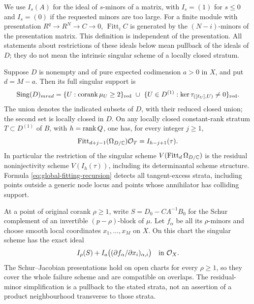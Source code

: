 We use $I_s(A)$ for the ideal of $s$-minors of a matrix, with
$I_s=(1)$ for $s\le0$ and $I_s=(0)$ if the requested minors are too
large. For a finite module with presentation $R^q\to R^N\to C\to0$,
$\operatorname{Fitt}_i C$ is generated by the $(N-i)$-minors of the
presentation matrix. This definition is independent of the presentation.
All statements about restrictions of these ideals below mean pullback
of the ideals of $D$; they do not mean the intrinsic singular scheme
of a locally closed stratum.

\begin{theorem}
\label{thm:global-polar-singularities}
Suppose $D$ is nonempty and of pure expected codimension $a>0$ in $X$,
and put $d=M-a$. Then its full singular support is
\begin{equation}\label{eq:global-singular-support}
 \operatorname{Sing}(D)_{
m red}
 =\{U:\operatorname{corank}\mu_U\ge2\}_{\rm red}
  \ \cup\ \{U\in D^{(1)}:\ker\tau_{([\ell_U],U)}\ne0\}_{\rm red}.
\end{equation}
The union denotes the indicated subsets of $D$, with their reduced
closed union; the second set is locally closed in $D$.
On any locally closed constant-rank stratum $T\subset D^{(1)}$ of
$B$, with $h=\operatorname{rank} Q$, one has, for every integer $j\ge1$,
\begin{equation}\label{eq:global-fitting-recursion}
 \operatorname{Fitt}_{d+j-1}(\Omega_{D/\mathbb C})\mathcal O_T
       = I_{h-j+1}(\tau).
\end{equation}
In particular the restriction of the singular scheme
$V(\operatorname{Fitt}_d\Omega_{D/\mathbb C})$ is the residual
noninjectivity scheme $V(I_h(\tau))$, including its determinantal
scheme structure. Formula \eqref{eq:global-fitting-recursion} detects
all tangent-excess strata, including points outside a generic node
locus and points whose annihilator has colliding support.

At a point of original corank $\rho\ge1$, write $S=D_0-CA^{-1}B_0$
for the Schur complement of an invertible $(p-\rho)$-block of $\mu$.
Let $f_\alpha$ be all its $\rho$-minors and choose smooth local
coordinates $x_1,\ldots,x_M$ on $X$. On this chart the singular scheme
has the exact ideal
\begin{equation}\label{eq:schur-singular-scheme}
 I_\rho(S)+I_a\big((\partial f_\alpha/\partial x_i)_{\alpha,i}\big)
       \quad\hbox{in }\mathcal O_X.
\end{equation}
The Schur--Jacobian presentations hold on open charts for every
$\rho\ge1$, so they cover the whole failure scheme and are
compatible on overlaps. The residual-minor simplification is a
pullback to the stated strata, not an assertion of a product
neighbourhood transverse to those strata.
\end{theorem}
